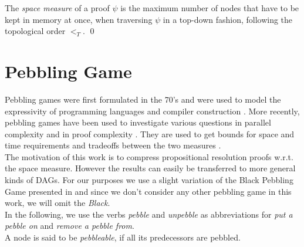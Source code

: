 \documentclass{llncs}
\begin{document}
\begin{definition}
\label{def:space measure}
The \emph{space measure} %
of a proof $\psi$ is the maximum number of nodes that have to be kept in memory at once, when traversing $\psi$ in a top-down fashion, following the topological order $<_T$.
\qed
\end{definition}

\section{Pebbling Game}
\label{sec:pebbling-game}
Pebbling games were first formulated in the 70's and were used to model the expressivity of programming languages \cite{paterson1970comparative,Walker1973404} and compiler construction \cite{sethi1975complete}.
More recently, pebbling games have been used to investigate various questions in parallel complexity \cite{chan2013pebble} and in proof complexity \cite{ben2008short,Esteban200184,nordstrom2009narrow}. They are used to get bounds for space and time requirements and tradeoffs between the two measures \cite{van1979move}.\\
The motivation of this work is to compress propositional resolution proofs w.r.t. the space measure. 
However the results can easily be transferred to more general kinds of DAGs.
For our purposes we use a slight variation of the Black Pebbling Game presented in \cite{hertel2007black,pippenger1982advances} and since we don't consider any other pebbling game in this work, we will omit the \textit{Black}.\\
In the following, we use the verbs \textit{pebble} and \textit{unpebble} as abbreviations for \textit{put a pebble on} and \textit{remove a pebble from}.\\
A node is said to be \textit{pebbleable}, if all its predecessors are pebbled.
\end{document}
